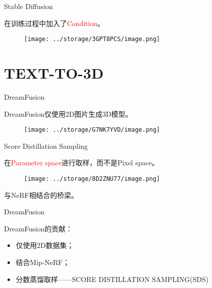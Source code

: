 \documentclass[dark]{sintefbeamer}
\begin{document}
\begin{frame}{Stable Diffusion}

  在训练过程中加入了\textcolor{red}{Condition}。

  \begin{figure}
    \texttt{[image: ../storage/3GPT8PCS/image.png]}
  \end{figure}

\end{frame}

\section{TEXT-TO-3D}

\begin{frame}[fragile]{DreamFusion}

DreamFusion\cite{pooleDreamFusionTextto3DUsing2022}仅使用2D图片生成3D模型。

    \begin{figure}
      \texttt{[image: ../storage/G7NK7YVD/image.png]}
    \end{figure}

\end{frame}

\begin{frame}{Score Distillation Sampling}

  在\textcolor{red}{Parameter space}进行取样，而不是Pixel space。

  \begin{figure}
    \texttt{[image: ../storage/8D2ZNU77/image.png]}
  \end{figure}

  与NeRF相结合的桥梁。

\end{frame}

\begin{frame}[fragile]{DreamFusion}

  DreamFusion的贡献：
  
  \begin{itemize}
    \item 仅使用2D数据集；
    \item 结合Mip-NeRF；
    \item 分数蒸馏取样——SCORE DISTILLATION SAMPLING(SDS)
  \end{itemize}
  
\end{frame}
\end{document}
